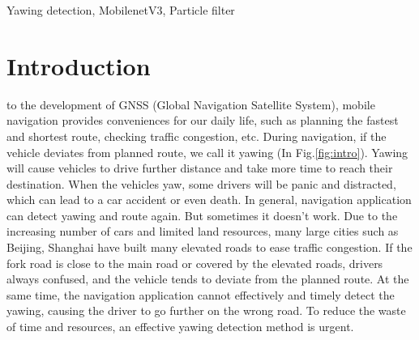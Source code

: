\documentclass[journal]{IEEEtran}
\begin{document}
\begin{IEEEkeywords}
  Yawing detection, MobilenetV3, Particle filter
\end{IEEEkeywords}

\section{Introduction}
 to the development of GNSS (Global Navigation Satellite System), mobile navigation provides conveniences for our daily life, such as planning the fastest and shortest route, checking traffic congestion, etc. During navigation, if the vehicle deviates from planned route, we call it yawing (In Fig.\ref{fig:intro}). Yawing will cause vehicles to drive further distance and take more time to reach their destination. When the vehicles yaw, some drivers will be panic and distracted, which can lead to a car accident or even death\cite{kandeel2021driver}. In general, navigation application can detect yawing and route again. But sometimes it doesn't work. Due to the increasing number of cars and limited land resources, many large cities such as Beijing, Shanghai have built many elevated roads to ease traffic congestion. If the fork road is close to the main road or covered by the elevated roads, drivers always confused, and the vehicle tends to deviate from the planned route. At the same time, the navigation application cannot effectively and timely detect the yawing, causing the driver to go further on the wrong road. To reduce the waste of time and resources, an effective yawing detection method is urgent. 

\end{document}
